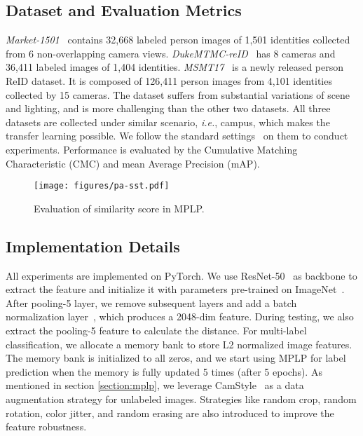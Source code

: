 \documentclass[10pt,twocolumn,letterpaper]{article}
\begin{document}
\subsection{Dataset and Evaluation Metrics}
\vspace{-1mm}
\emph{Market-1501}~\cite{zheng2015scalable} contains 32,668 labeled person images of 1,501 identities collected from 6 non-overlapping camera views. \emph{DukeMTMC-reID}~\cite{ristani2016performance} has 8 cameras and 36,411 labeled images of 1,404 identities. \emph{MSMT17}~\cite{wei2018person} is a newly released person ReID dataset. It is composed of 126,411 person images from 4,101 identities collected by 15 cameras. The dataset suffers from substantial variations of scene and lighting, and is more challenging than the other two datasets. All three datasets are collected under similar scenario, \emph{i.e.}, campus, which makes the transfer learning possible. We follow the standard settings~\cite{zheng2015scalable,ristani2016performance,wei2018person} on them to conduct experiments. Performance is evaluated by the Cumulative Matching Characteristic (CMC) and mean Average Precision (mAP).

\begin{figure}
\begin{center}
\texttt{[image: figures/pa-sst.pdf]}
\end{center}
\vspace{-2mm}
\caption{Evaluation of similarity score  in MPLP.}
\vspace{-2mm}
\label{figure:pa-sst}
\end{figure}

\vspace{-1mm}
\subsection{Implementation Details}\label{sec:implement}
\vspace{-1mm}
All experiments are implemented on PyTorch. We use ResNet-50~\cite{he2016deep} as backbone to extract the feature and initialize it with parameters pre-trained on ImageNet~\cite{5206848}. After pooling-5 layer, we remove subsequent layers and add a batch normalization layer~\cite{ioffe2015batch}, which produces a 2048-dim feature. During testing, we also extract the pooling-5 feature to calculate the distance. For multi-label classification, we allocate a memory bank to store L2 normalized image features. The memory bank is initialized to all zeros, and we start using MPLP for label prediction when the memory is fully updated 5 times (after 5 epochs). As mentioned in section \ref{section:mplp}, we leverage CamStyle~\cite{zhong2018camera} as a data augmentation strategy for unlabeled images. Strategies like random crop, random rotation, color jitter, and random erasing are also introduced to improve the feature robustness.
\end{document}
